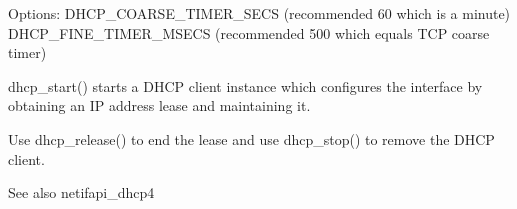 Options\+: D\+H\+C\+P\+\_\+\+C\+O\+A\+R\+S\+E\+\_\+\+T\+I\+M\+E\+R\+\_\+\+S\+E\+CS (recommended 60 which is a minute) D\+H\+C\+P\+\_\+\+F\+I\+N\+E\+\_\+\+T\+I\+M\+E\+R\+\_\+\+M\+S\+E\+CS (recommended 500 which equals T\+CP coarse timer)

dhcp\+\_\+start() starts a D\+H\+CP client instance which configures the interface by obtaining an IP address lease and maintaining it.

Use dhcp\+\_\+release() to end the lease and use dhcp\+\_\+stop() to remove the D\+H\+CP client.

\begin{DoxySeeAlso}{See also}
netifapi\+\_\+dhcp4 
\end{DoxySeeAlso}
